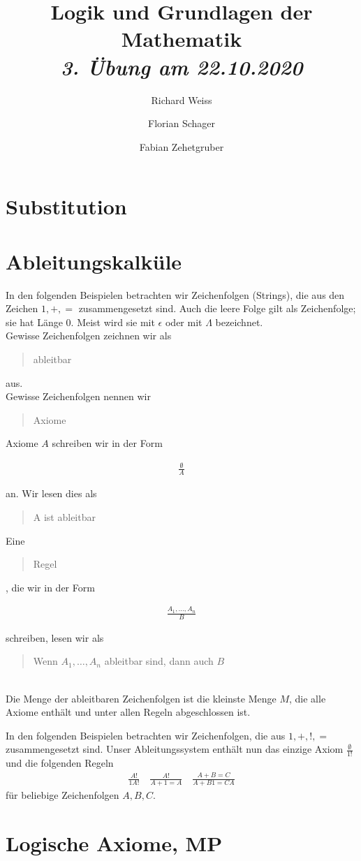 \documentclass{article}
\title
{
  Logik und Grundlagen der Mathematik \\
  \vspace{4pt}
  \normalsize
  \textit{3. Übung am 22.10.2020}
}
\author
{
  Richard Weiss
  \and
  Florian Schager
  \and
  Fabian Zehetgruber
}
\date{}
\begin{document}
\maketitle

\section*{Substitution}




\section*{Ableitungskalküle}

In den folgenden Beispielen betrachten wir Zeichenfolgen (Strings), die aus
den Zeichen $1,+,=$ zusammengesetzt sind. Auch die leere Folge gilt als
Zeichenfolge; sie hat Länge $0$. Meist wird sie mit $\epsilon$ oder mit $\Lambda$
bezeichnet. \\
Gewisse Zeichenfolgen zeichnen wir als \blockquote{ableitbar} aus. \\
Gewisse Zeichenfolgen nennen wir \blockquote{Axiome}. Axiome $A$ schreiben wir in
der Form

\begin{align*}
  \frac{\emptyset}{A}
\end{align*}

an. Wir lesen dies als \blockquote{A ist ableitbar}. Eine \blockquote{Regel}, die wir in
der Form

\begin{align*}
  \frac{A_1,\dots,A_n}{B}
\end{align*}

schreiben, lesen wir als \blockquote{Wenn $A_1,\dots,A_n$ ableitbar sind, dann auch $B$}. \\
Die Menge der ableitbaren Zeichenfolgen ist die kleinste Menge $M$, die alle
Axiome enthält und unter allen Regeln abgeschlossen ist.



In den folgenden Beispielen betrachten wir Zeichenfolgen, die aus $1,+,!,=$
zusammengesetzt sind. Unser Ableitungssystem enthält nun das einzige Axiom
$\frac{\emptyset}{1!}$ und die folgenden Regeln
\begin{align*}
  \frac{A!}{1A!} \quad \frac{A!}{A + 1 = A} \quad \frac{A + B = C}{A + B1 = CA}
\end{align*}
für beliebige Zeichenfolgen $A,B,C$.




\section*{Logische Axiome, MP}

\end{document}
